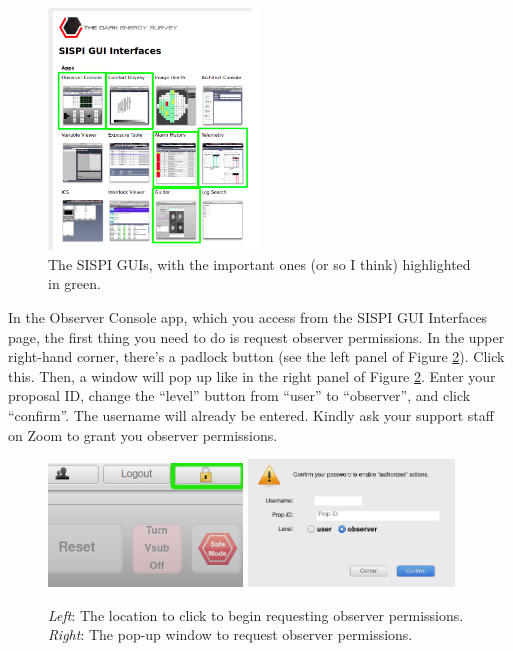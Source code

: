 \begin{figure}
    \centering
    \includegraphics[width=0.5\textwidth]{figs/observing/sispi.png}
    \caption{The SISPI GUIs, with the important ones (or so I think) highlighted in green.}
    \label{fig:sispi}
\end{figure}

In the Observer Console app, which you access from the SISPI GUI Interfaces page, the first thing you need to do is request observer permissions. In the upper right-hand corner, there's a padlock button (see the left panel of Figure \ref{fig:request}). Click this. Then, a window will pop up like in the right panel of Figure \ref{fig:request}. Enter your proposal ID, change the ``level'' button from ``user'' to ``observer'', and click ``confirm''. The username will already be entered. Kindly ask your support staff on Zoom to grant you observer permissions. \\

\begin{figure}
    \centering
    \includegraphics[width=0.46\textwidth]{figs/observing/request.png}
    \includegraphics[width=0.49\textwidth]{figs/observing/request_2.png}
    \caption{\textit{Left}: The location to click to begin requesting observer permissions. \textit{Right}: The pop-up window to request observer permissions.}
    \label{fig:request}
\end{figure}

